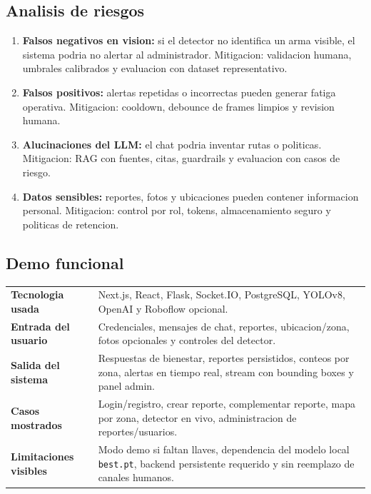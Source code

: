 \documentclass[11pt,letterpaper]{article}
\begin{document}
\subsection{Analisis de riesgos}

\begin{enumerate}[label=\arabic*.]
    \item \textbf{Falsos negativos en vision:} si el detector no identifica un arma visible, el sistema podria no alertar al administrador. Mitigacion: validacion humana, umbrales calibrados y evaluacion con dataset representativo.
    \item \textbf{Falsos positivos:} alertas repetidas o incorrectas pueden generar fatiga operativa. Mitigacion: cooldown, debounce de frames limpios y revision humana.
    \item \textbf{Alucinaciones del LLM:} el chat podria inventar rutas o politicas. Mitigacion: RAG con fuentes, citas, guardrails y evaluacion con casos de riesgo.
    \item \textbf{Datos sensibles:} reportes, fotos y ubicaciones pueden contener informacion personal. Mitigacion: control por rol, tokens, almacenamiento seguro y politicas de retencion.
\end{enumerate}

\subsection{Demo funcional}

\begin{tabularx}{\textwidth}{P{4cm}Y}
    \toprule
    \textbf{Tecnologia usada} & Next.js, React, Flask, Socket.IO, PostgreSQL, YOLOv8, OpenAI y Roboflow opcional. \\
    \textbf{Entrada del usuario} & Credenciales, mensajes de chat, reportes, ubicacion/zona, fotos opcionales y controles del detector. \\
    \textbf{Salida del sistema} & Respuestas de bienestar, reportes persistidos, conteos por zona, alertas en tiempo real, stream con bounding boxes y panel admin. \\
    \textbf{Casos mostrados} & Login/registro, crear reporte, complementar reporte, mapa por zona, detector en vivo, administracion de reportes/usuarios. \\
    \textbf{Limitaciones visibles} & Modo demo si faltan llaves, dependencia del modelo local \texttt{best.pt}, backend persistente requerido y sin reemplazo de canales humanos. \\
    \bottomrule
\end{tabularx}
\end{document}
